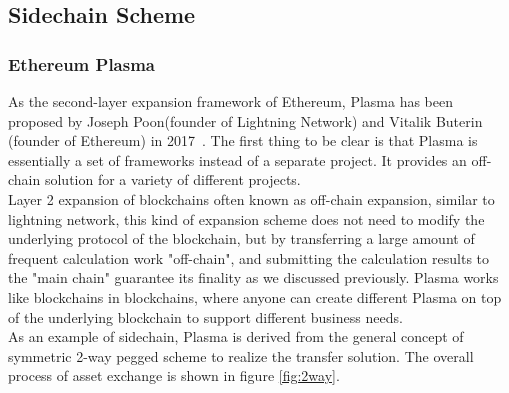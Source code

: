 \subsection{Sidechain Scheme}
\label{sec:side}


\subsubsection{Ethereum Plasma}
\noindent As the second-layer expansion framework of Ethereum, Plasma has been proposed by Joseph Poon(founder of Lightning Network) and Vitalik Buterin (founder of Ethereum) in 2017~\cite{poon2017plasma}. The first thing to be clear is that Plasma is essentially a set of frameworks instead of a separate project. It provides an off-chain solution for a variety of different projects. \\

\noindent Layer 2 expansion of blockchains often known as off-chain expansion, similar to lightning network, this kind of expansion scheme does not need to modify the underlying protocol of the blockchain, but by transferring a large amount of frequent calculation work "off-chain", and submitting the calculation results to the "main chain" guarantee its finality as we discussed previously. Plasma works like blockchains in blockchains, where anyone can create different Plasma on top of the underlying blockchain to support different business needs. \\

\noindent As an example of sidechain, Plasma is derived from the general concept of symmetric 2-way pegged scheme to realize the transfer solution. The overall process of asset exchange is shown in figure \ref{fig:2way}. 

